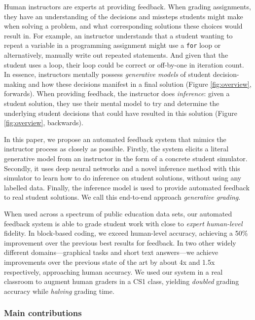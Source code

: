 Human instructors are experts at providing feedback. When grading assignments, they have an understanding of the decisions and missteps students might make when solving a problem, and what corresponding solutions these choices would result in. 
For example, an instructor understands that a student wanting to repeat a variable in a programming assignment might use a \texttt{for} loop or alternatively, manually write out repeated statements. And given that the student uses a loop, their loop could be correct or off-by-one in iteration count. 
In essence, instructors mentally possess \textit{generative models} of student decision-making and how these decisions manifest in a final solution (Figure \ref{fig:overview}, forwards). When providing feedback, the instructor does \textit{inference}: given a student solution, they use their mental model to try and determine the underlying student decisions that could have resulted in this solution (Figure \ref{fig:overview}, backwards).

In this paper, we propose an automated feedback system that mimics the instructor process as closely as possible. Firstly, the system elicits a literal generative model from an instructor in the form of a concrete student simulator. Secondly, it uses deep neural networks and a novel inference method with this simulator to learn how to do inference on student solutions, without using any labelled data. Finally, the inference model is used to provide automated feedback to real student solutions. We call this end-to-end approach \textit{generative grading}.

When used across a spectrum of public education data sets, our automated feedback system is able to grade student work with close to \textit{expert human-level} fidelity.
In block-based coding, we exceed human-level accuracy, achieving a 50\% improvement over the previous best results for feedback. In two other widely different domains---graphical tasks and short text answers---we achieve improvements over the previous state of the art by about 4x and 1.5x respectively, approaching human accuracy. 
We used our system in a real classroom to augment human graders in a CS1 class, yielding \textit{doubled} grading accuracy while \textit{halving} grading time. 


\subsubsection{Main contributions}

